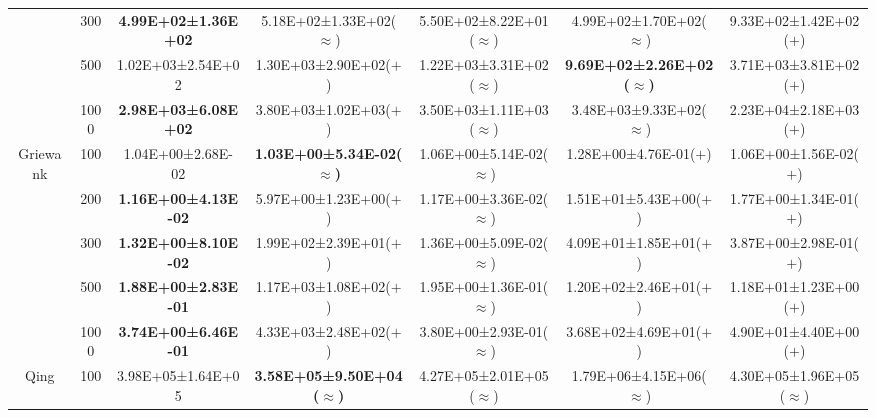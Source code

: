 \begin{tabular}{|cc|c|c|c|c|c|}
\multicolumn{1}{|c|}{}                            & 300       & \textbf{4.99E+02±1.36E+02} & 5.18E+02±1.33E+02($\approx$)          & 5.50E+02±8.22E+01($\approx$) & 4.99E+02±1.70E+02($\approx$)          & 9.33E+02±1.42E+02($+$)                \\ \cline{2-7} 
\multicolumn{1}{|c|}{}                            & 500       & 1.02E+03±2.54E+02          & 1.30E+03±2.90E+02($+$)                & 1.22E+03±3.31E+02($\approx$) & \textbf{9.69E+02±2.26E+02($\approx$)} & 3.71E+03±3.81E+02($+$)                \\ \cline{2-7} 
\multicolumn{1}{|c|}{}                            & 1000      & \textbf{2.98E+03±6.08E+02} & 3.80E+03±1.02E+03($+$)                & 3.50E+03±1.11E+03($\approx$) & 3.48E+03±9.33E+02($\approx$)          & 2.23E+04±2.18E+03($+$)                \\ \hline
\multicolumn{1}{|c|}{\multirow{5}{*}{Griewank}}   & 100       & 1.04E+00±2.68E-02          & \textbf{1.03E+00±5.34E-02($\approx$)} & 1.06E+00±5.14E-02($\approx$) & 1.28E+00±4.76E-01($+$)                & 1.06E+00±1.56E-02($+$)                \\ \cline{2-7} 
\multicolumn{1}{|c|}{}                            & 200       & \textbf{1.16E+00±4.13E-02} & 5.97E+00±1.23E+00($+$)                & 1.17E+00±3.36E-02($\approx$) & 1.51E+01±5.43E+00($+$)                & 1.77E+00±1.34E-01($+$)                \\ \cline{2-7} 
\multicolumn{1}{|c|}{}                            & 300       & \textbf{1.32E+00±8.10E-02} & 1.99E+02±2.39E+01($+$)                & 1.36E+00±5.09E-02($\approx$) & 4.09E+01±1.85E+01($+$)                & 3.87E+00±2.98E-01($+$)                \\ \cline{2-7} 
\multicolumn{1}{|c|}{}                            & 500       & \textbf{1.88E+00±2.83E-01} & 1.17E+03±1.08E+02($+$)                & 1.95E+00±1.36E-01($\approx$) & 1.20E+02±2.46E+01($+$)                & 1.18E+01±1.23E+00($+$)                \\ \cline{2-7} 
\multicolumn{1}{|c|}{}                            & 1000      & \textbf{3.74E+00±6.46E-01} & 4.33E+03±2.48E+02($+$)                & 3.80E+00±2.93E-01($\approx$) & 3.68E+02±4.69E+01($+$)                & 4.90E+01±4.40E+00($+$)                \\ \hline
\multicolumn{1}{|c|}{\multirow{5}{*}{Qing}}       & 100       & 3.98E+05±1.64E+05          & \textbf{3.58E+05±9.50E+04($\approx$)} & 4.27E+05±2.01E+05($\approx$) & 1.79E+06±4.15E+06($\approx$)          & 4.30E+05±1.96E+05($\approx$)          \\ \cline{2-7} 

\end{tabular}
